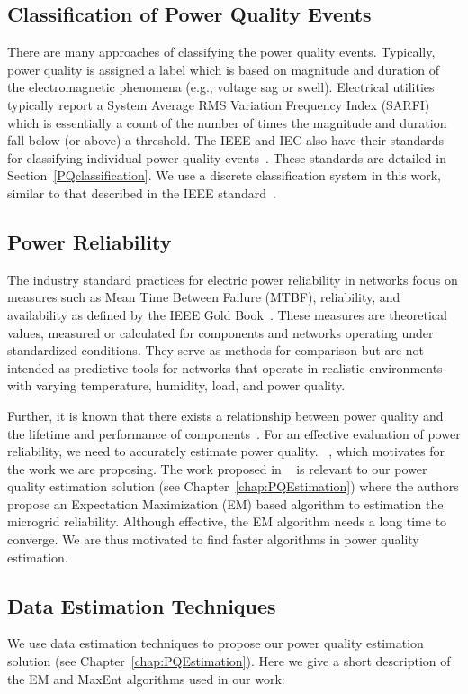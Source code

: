 \subsection{Classification of Power Quality Events}
There are many approaches of classifying the power quality events. Typically, power quality is assigned a label which is based on magnitude and duration of the electromagnetic phenomena (e.g., voltage sag or swell). Electrical utilities typically report a System Average RMS Variation Frequency Index (SARFI) which is essentially a count of the number of times the magnitude and duration fall below (or above) a threshold. The IEEE and IEC also have their standards for classifying individual power quality events~\cite{iec_61000, IEEE09_1159}. These standards are detailed in Section~\ref{PQclassification}. We use a discrete classification system in this work, similar to that described in the IEEE standard~\cite{IEEE09_1159}. 

\subsection{Power Reliability}
The industry standard practices for electric power reliability in networks focus on measures such as Mean Time Between Failure (MTBF), reliability, and availability as defined by the IEEE Gold Book~\cite{goldbook}. These measures are theoretical values, measured or calculated for components and networks operating under standardized conditions. They serve as methods for comparison but are not intended as predictive tools for networks that operate in realistic environments with varying temperature, humidity, load, and power quality.

Further, it is known that there exists a relationship between power quality and the lifetime and performance of components~\cite{iti_curve}. For an effective evaluation of power reliability, we need to accurately estimate power quality. ~\cite{catherine_pri}, which motivates for the work we are proposing. The work proposed in ~\cite{catherine_pri} is relevant to our power quality estimation solution (see Chapter~\ref{chap:PQEstimation}) where the authors propose an Expectation Maximization (EM) based algorithm to estimation the microgrid reliability. Although effective, the EM algorithm needs a long time to converge. We are thus motivated to find faster algorithms in power quality estimation.

\subsection{Data Estimation Techniques}
We use data estimation techniques to propose our power quality estimation solution (see Chapter~\ref{chap:PQEstimation}). Here we give a short description of the EM and MaxEnt algorithms used in our work:



